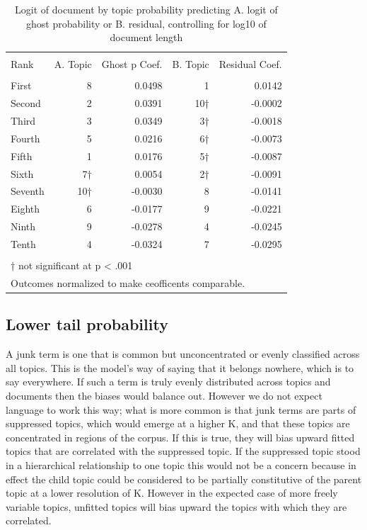 \documentclass[]{book}
\theoremstyle{definition}
\theoremstyle{definition}
\theoremstyle{definition}
\theoremstyle{remark}
\begin{document}
\begin{table}[!htbp] \centering 
  \caption{Logit of document by topic probability predicting A. logit of ghost probability or B. residual, controlling for log10 of document length} 
  \label{tab:Kghost} 
\begin{tabular}{@{\extracolsep{5pt}} lrrrr} 
\\[-1.8ex]\hline 
\hline \\[-1.8ex] 
Rank & A. Topic & Ghost p Coef. & B. Topic & Residual Coef. \\ 
\hline \\[-1.8ex] 
First & 8 &  0.0498 & 1 &  0.0142 \\ 
Second & 2 &  0.0391 & 10† & -0.0002 \\ 
Third & 3 &  0.0349 & 3† & -0.0018 \\ 
Fourth & 5 &  0.0216 & 6† & -0.0073 \\ 
Fifth & 1 &  0.0176 & 5† & -0.0087 \\ 
Sixth & 7† &  0.0054 & 2† & -0.0091 \\ 
Seventh & 10† & -0.0030 & 8 & -0.0141 \\ 
Eighth & 6 & -0.0177 & 9 & -0.0221 \\ 
Ninth & 9 & -0.0278 & 4 & -0.0245 \\ 
Tenth & 4 & -0.0324 & 7 & -0.0295 \\ 
\hline \\[-1.8ex] 
\multicolumn{5}{l}{† not significant at p < .001} \\ 
\multicolumn{5}{l}{Outcomes normalized to make ceofficents comparable.} \\ 
\end{tabular} 
\end{table}

\hypertarget{lower-tail-probability}{%
\subsection{Lower tail probability}\label{lower-tail-probability}}

A junk term is one that is common but unconcentrated or evenly
classified across all topics. This is the model's way of saying that it
belongs nowhere, which is to say everywhere. If such a term is truly
evenly distributed across topics and documents then the biases would
balance out. However we do not expect language to work this way; what is
more common is that junk terms are parts of suppressed topics, which
would emerge at a higher K, and that these topics are concentrated in
regions of the corpus. If this is true, they will bias upward fitted
topics that are correlated with the suppressed topic. If the suppressed
topic stood in a hierarchical relationship to one topic this would not
be a concern because in effect the child topic could be considered to be
partially constitutive of the parent topic at a lower resolution of K.
However in the expected case of more freely variable topics, unfitted
topics will bias upward the topics with which they are correlated.
\end{document}
